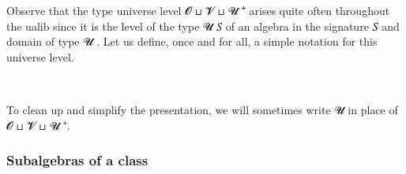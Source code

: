 \ccpad
Observe that the type universe level \ab 𝓞 \af ⊔ \ab 𝓥 \af ⊔ \ab 𝓤 \af ⁺ arises quite often throughout the ualib since it is the level of the type  \ab 𝓤 \ab 𝑆 of an algebra in the signature \ab 𝑆 and domain of type \ab 𝓤 \af ̇. Let us define, once and for all, a simple notation for this universe level.
\ccpad
\begin{code}%
\>[0]\AgdaSpace{}%
\AgdaSymbol{:}\AgdaSpace{}%
\AgdaSpace{}%
\AgdaSpace{}%
\<%
\\
\>[0]\AgdaSpace{}%
\AgdaSpace{}%
\AgdaSymbol{=}\AgdaSpace{}%
\AgdaSpace{}%
\AgdaSpace{}%
\AgdaSpace{}%
\AgdaSpace{}%
\AgdaSpace{}%
\<%
\end{code}
\ccpad
To clean up and simplify the presentation, we will sometimes write  \ab 𝓤 in place of \ab 𝓞 \af ⊔ \ab 𝓥 \af ⊔ \ab 𝓤 \af ⁺.

\subsubsection{Subalgebras of a class}\label{subalgebras-of-a-class}

